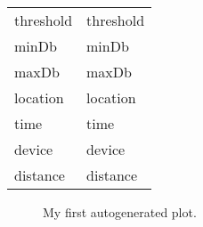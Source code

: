 \documentclass{article}
\begin{document}
\begin{table}[h]
    \centering
    \begin{tabular}{l l}
        threshold & {{threshold}} \\
        minDb     & {{minDb}}     \\
        maxDb     & {{maxDb}}     \\
        location  & {{location}}  \\
        time      & {{time}}      \\
        device    & {{device}}    \\
        distance  & {{distance}}  \\
    \end{tabular}
    \label{tab:table}
\end{table}

\begin{figure}[h!]
    \begin{center}
        \caption{My first autogenerated plot.}
    \end{center}
    \label{fig:figure}
\end{figure}
\end{document}
